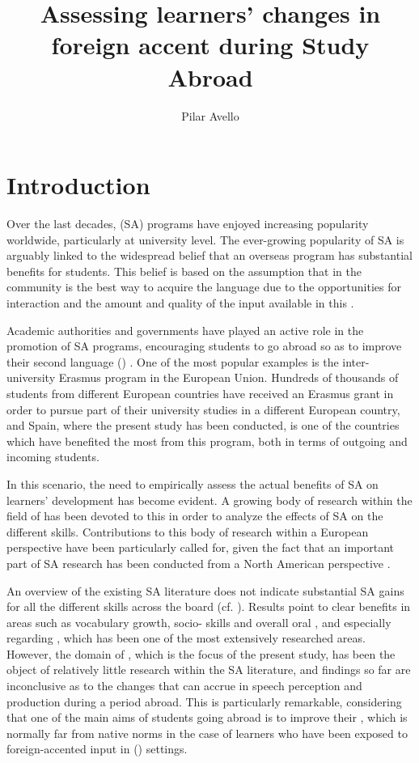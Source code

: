 \documentclass[output=paper]{langsci/langscibook}
\author{Pilar Avello\affiliation{Universitat Pompeu Fabra}}
\title{Assessing learners’ changes in foreign accent during Study Abroad}
\begin{document}
  
\section{Introduction} 

Over the last decades,  (SA) programs have enjoyed increasing popularity worldwide, particularly at university level. The ever-growing popularity of SA is arguably linked to the widespread belief that an overseas program has substantial  benefits for students. This belief is based on the assumption that  in the  community is the best way to acquire the language due to the opportunities for interaction and the amount and quality of the input available in this .

Academic authorities and governments have played an active role in the promotion of SA programs, encouraging students to go abroad so as to improve their second language () . One of the most popular examples is the inter-university Erasmus program in the European Union. Hundreds of thousands of students from different European countries have received an Erasmus grant in order to pursue part of their university studies in a different European country, and Spain, where the present study has been conducted, is one of the countries which have benefited the most from this program, both in terms of outgoing and incoming students.

In this scenario, the need to empirically assess the actual benefits of SA on learners’  development has become evident. A growing body of research within the field of   has been devoted to this  in order to analyze the effects of SA on the different  skills. Contributions to this body of research within a European perspective have been particularly called for, given the fact that an important part of SA research has been conducted from a North American perspective \citep{Coleman1998}. 

An overview of the existing SA literature does not indicate substantial SA gains for all the different  skills across the board (cf. \citealt{DeKeyser2007study}). Results point to clear benefits in areas such as vocabulary growth, socio- skills and overall oral , and especially regarding , which has been one of the most extensively researched areas. However, the domain of , which is the focus of the present study, has been the object of relatively little research within the SA literature, and findings so far are inconclusive as to the changes that can accrue in  speech perception and production during a period abroad. This is particularly remarkable, considering that one of the main aims of students going abroad is to improve their  , which is normally far from native norms in the case of learners who have been exposed to foreign-accented input in  () settings. 
\end{document}
